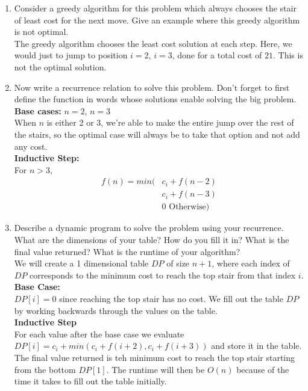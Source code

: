 \documentclass{article}
\begin{document}
\begin{enumerate}
\begin{enumerate}
\item Consider a greedy algorithm for this problem which always chooses the stair of least cost for the next move. Give an example where this greedy algorithm is not optimal. \\

The greedy algorithm chooses the least cost solution at each step. Here, we would just to jump to position $i=2$, $i=3$, done for a total cost of $21$. This is not the optimal solution. \\





\newpage
\item Now write a recurrence relation to solve this problem. Don't forget to first define the function in words whose solutions enable solving the big problem. \\

\textbf{Base cases:} $n = 2$, $n = 3$ \\
When $n$ is either 2 or 3, we're able to make the entire jump over the rest of the stairs, so the optimal case will always be to take that option and not add any cost. \\


\textbf{Inductive Step:} \\
For $n > 3$, 
\begin{align*}
    f(n) = min ( & c_i + f(n - 2) \\
    & c_i + f(n-3) \\
    & 0 \text{ Otherwise} )
\end{align*}






\item Describe a dynamic program to solve the problem using your recurrence. What are the dimensions of your table? How do you fill it in? What is the final value returned? What is the runtime of your algorithm? \\

We will create a 1 dimensional table $DP$ of size $n+1$, where each index of $DP$ corresponds to the minimum cost to reach the top stair from that index $i$. \\
\newline 
\textbf{Base Case:} \\
$DP[i] = 0$ since reaching the top stair has no cost. We fill out the table $DP$ by working backwards through the values on the table. \\
\newline 
\textbf{Inductive Step} \\
For each value after the base case we evaluate $DP[i] = c_i + min(c_i + f(i+2), c_i + f(i+3))$ and store it in the table. The final value returned is teh minimum cost to reach the top stair starting from the bottom $DP[1]$. The runtime will then be $O(n)$ because of the time it takes to fill out the table initially. 






\end{enumerate}
\end{enumerate}
\end{document}
